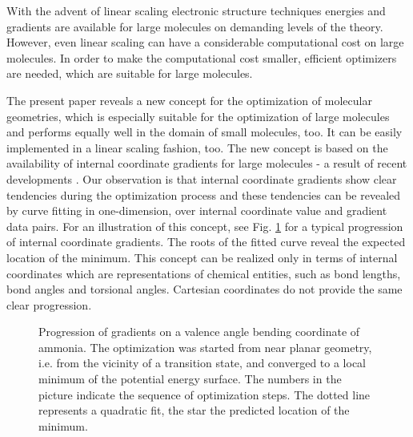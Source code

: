 \documentclass[prl,aps,twocolumn,showpacs,twocolumngrid,superbib]{revtex4}
\begin{document}
With the advent of linear scaling electronic structure techniques 
\cite{Goedecker99}
energies and gradients are available for large molecules on demanding
levels of the theory. However, even linear scaling can have 
a considerable computational cost on large molecules. In order to
make the computational cost smaller, efficient optimizers are
needed, which are suitable for large molecules.

The present paper reveals a new concept for the optimization of
molecular geometries, which is especially suitable for the
optimization of large molecules and performs equally well in the
domain of small molecules, too. It can be easily implemented
in a linear scaling fashion, too.
The new concept is based on the availability of internal coordinate
gradients for large molecules - a result of recent developments
\cite{paizs_coordtrf1,nemeth_coordtrf1,paizs_coordtrf2,nemeth_coordtrf2,billeter_coordtrf,andzelm_coordtrf,kudin_coordtrf}.
Our observation is that internal coordinate gradients show clear
tendencies during the optimization process and these tendencies can be revealed
by curve fitting in one-dimension, over internal coordinate value and gradient
data pairs. For an illustration of this concept,
see Fig. \ref{NH3outp6} for a typical progression of internal coordinate
gradients. The roots of the fitted curve reveal the expected location
of the minimum. This concept can be realized only in terms of
internal coordinates which are representations of chemical entities, such as
bond lengths, bond angles and torsional angles. Cartesian
coordinates do not provide the same clear progression.
\begin{figure}[h]
\caption{
\small  
Progression of gradients on a valence angle bending coordinate of
ammonia. The optimization was started from near planar geometry, i.e.
from the vicinity of a transition state, and converged to a local 
minimum of the potential energy surface. The numbers in the picture
indicate the sequence of optimization steps. The dotted line represents
a quadratic fit, the star the predicted location of the minimum.
\label{NH3outp6}
}
\end{figure}
\end{document}

